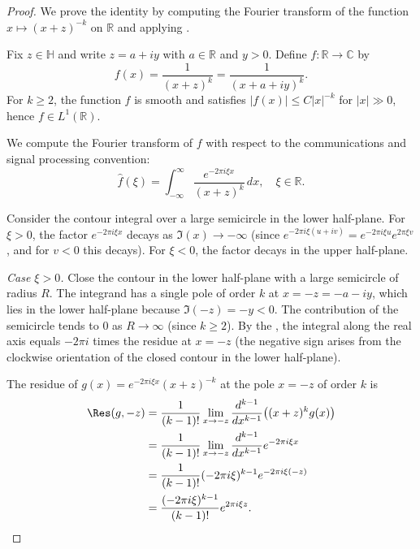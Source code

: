 \begin{proof}
We prove the identity by computing the Fourier transform of the function $x \mapsto (x+z)^{-k}$ on $\mathbb{R}$ and applying .

Fix $z \in \mathbb{H}$ and write $z = a + iy$ with $a \in \mathbb{R}$ and $y > 0$. Define $f : \mathbb{R} \to \mathbb{C}$ by
$$f(x) = \frac{1}{(x+z)^k} = \frac{1}{(x + a + iy)^k}.$$
For $k \geq 2$, the function $f$ is smooth and satisfies $|f(x)| \leq C |x|^{-k}$ for $|x| \gg 0$, hence $f \in L^1(\mathbb{R})$.

We compute the Fourier transform of $f$ with respect to the communications and signal processing convention:
$$\hat{f}(\xi) = \int_{-\infty}^{\infty} \frac{e^{-2\pi i \xi x}}{(x+z)^k} \, dx, \quad \xi \in \mathbb{R}.$$

Consider the contour integral over a large semicircle in the lower half-plane. For $\xi > 0$, the factor $e^{-2\pi i \xi x}$ decays as $\Im(x) \to -\infty$ (since $e^{-2\pi i \xi (u+iv)} = e^{-2\pi i \xi u} e^{2\pi \xi v}$, and for $v < 0$ this decays). For $\xi < 0$, the factor decays in the upper half-plane.

\medskip
\noindent\textit{Case $\xi > 0$.} Close the contour in the lower half-plane with a large semicircle of radius $R$. The integrand has a single pole of order $k$ at $x = -z = -a - iy$, which lies in the lower half-plane because $\Im(-z) = -y < 0$. The contribution of the semicircle tends to $0$ as $R \to \infty$ (since $k \geq 2$). By the , the integral along the real axis equals $-2\pi i$ times the residue at $x = -z$ (the negative sign arises from the clockwise orientation of the closed contour in the lower half-plane).

The residue of $g(x) = e^{-2\pi i \xi x} (x+z)^{-k}$ at the pole $x = -z$ of order $k$ is
\begin{align*}
\Res(g, -z) &= \frac{1}{(k-1)!} \lim_{x \to -z} \frac{d^{k-1}}{dx^{k-1}} \bigl( (x+z)^k g(x) \bigr) \\
&= \frac{1}{(k-1)!} \lim_{x \to -z} \frac{d^{k-1}}{dx^{k-1}} e^{-2\pi i \xi x} \\
&= \frac{1}{(k-1)!} (-2\pi i \xi)^{k-1} e^{-2\pi i \xi (-z)} \\
&= \frac{(-2\pi i \xi)^{k-1}}{(k-1)!} e^{2\pi i \xi z}.
\end{align*}


\end{proof}
